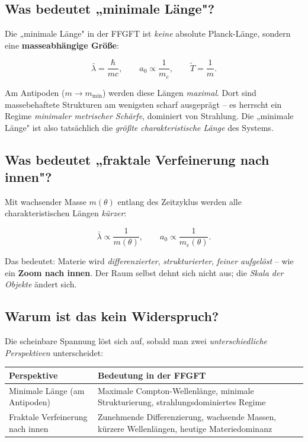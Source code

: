 \subsection{Was bedeutet „minimale Länge"?}

Die „minimale Länge" in der FFGFT ist \emph{keine} absolute Planck-Länge,
sondern eine \textbf{masseabhängige Größe}:

\[
\bar\lambda = \frac{\hbar}{m c}, \qquad
a_0 \propto \frac{1}{m_e}, \qquad
\tilde{T} = \frac{1}{m}.
\]

Am Antipoden ($m \to m_\text{min}$) werden diese Längen \emph{maximal}.
Dort sind massebehaftete Strukturen am wenigsten scharf ausgeprägt –
es herrscht ein Regime \emph{minimaler metrischer Schärfe}, dominiert
von Strahlung. Die „minimale Länge" ist also tatsächlich die
\emph{größte charakteristische Länge} des Systems.

\subsection{Was bedeutet „fraktale Verfeinerung nach innen"?}

Mit wachsender Masse $m(\theta)$ entlang des Zeitzyklus werden alle
charakteristischen Längen \emph{kürzer}:

\[
\bar\lambda \propto \frac{1}{m(\theta)}, \qquad
a_0 \propto \frac{1}{m_e(\theta)}.
\]

Das bedeutet: Materie wird \emph{differenzierter}, \emph{strukturierter},
\emph{feiner aufgelöst} – wie ein \textbf{Zoom nach innen}.
Der Raum selbst dehnt sich nicht aus; die \emph{Skala der Objekte}
ändert sich.

\subsection{Warum ist das kein Widerspruch?}

Die scheinbare Spannung löst sich auf, sobald man zwei
\emph{unterschiedliche Perspektiven} unterscheidet:

\begin{center}
	\small
	\begin{tabular}{p{}p{}}
		\toprule
		\textbf{Perspektive} & \textbf{Bedeutung in der FFGFT} \\
		\midrule
		Minimale Länge (am Antipoden) & 
		Maximale Compton-Wellenlänge, minimale Strukturierung,
		strahlungsdominiertes Regime \\
		Fraktale Verfeinerung nach innen & 
		Zunehmende Differenzierung, wachsende Massen,
		kürzere Wellenlängen, heutige Materiedominanz \\
		\bottomrule
	\end{tabular}
\end{center}

